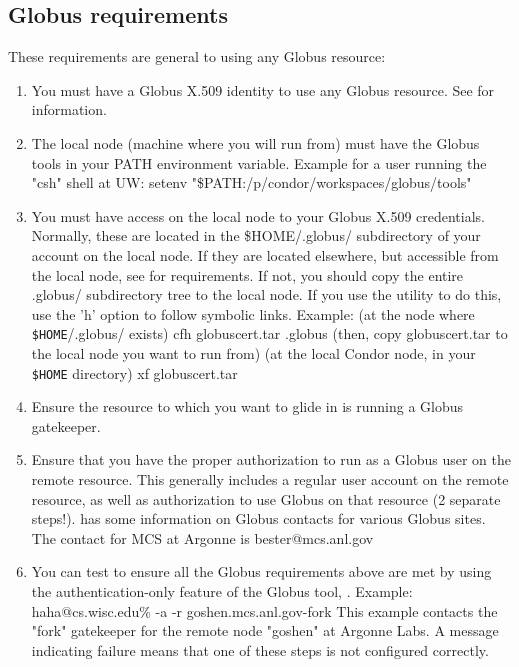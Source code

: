 \subsection{Globus requirements}
These requirements are general to using any Globus resource:
\begin{enumerate}

\item You must have a Globus X.509 identity to use any Globus resource.
   See  for information.

\item The local node (machine where you will run  from)
   must have the Globus tools in your PATH environment variable.
   Example for a user running the "csh" shell at UW:
   setenv  "\$PATH:/p/condor/workspaces/globus/tools"

\item You must have access on the local node to your Globus X.509 credentials. 
   Normally, these are located in the \$HOME/.globus/ subdirectory of your 
   account on the local node. If they are located elsewhere, but accessible
   from the local node, see  
   for requirements. If not, you should copy the entire .globus/ subdirectory
   tree to the local node. If you use the  utility to do this, use the
   'h' option to follow symbolic links.
   Example:
    (at the node where \texttt{\$HOME}/.globus/ exists)  cfh globuscert.tar .globus
    (then, copy globuscert.tar to the local node you want to run
        from)
    (at the local Condor node, in your \texttt{\$HOME} directory)  xf globuscert.tar
   
\item Ensure the resource to which you want to glide in is running
   a Globus gatekeeper.

\item Ensure that you have the proper authorization to run as a Globus
   user on the remote resource. This generally includes a regular
   user account on the remote resource, as well as authorization to
   use Globus on that resource (2 separate steps!). 
    has some information on Globus contacts for
   various Globus sites. The contact for MCS at Argonne is 
   bester@mcs.anl.gov

\item You can test to ensure all the Globus requirements above are met by 
   using the authentication-only feature of the Globus tool, .
   Example: haha@cs.wisc.edu\%  -a -r goshen.mcs.anl.gov-fork
   This example contacts the "fork" gatekeeper for the remote node
   "goshen" at Argonne Labs. A message indicating failure means that
   one of these steps is not configured correctly.

\end{enumerate}

